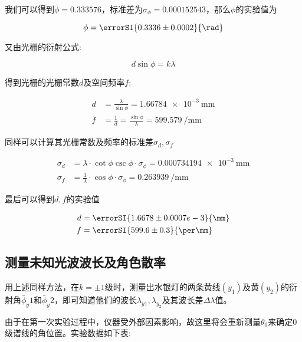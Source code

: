\documentclass[a4paper]{article}
\begin{document}
我们可以得到$\bar\phi=0.333576$，标准差为$\sigma_{\phi}=0.000152543$，那么$\phi$的实验值为

$$\phi=\errorSI{0.3336 \pm 0.0002}{\rad}$$

又由光栅的衍射公式:

$$d\sin{\phi}=k\lambda$$

得到光栅的光栅常数$d$及空间频率$f$:

$$\begin{aligned}
		d & =\frac{\lambda}{\sin{\phi}}=\SI{1.66784e-3}{\mm}              \\
		f & =\frac{1}{d}=\frac{\sin{\phi}}{\lambda}=\SI{599.579}{\per\mm}
	\end{aligned}$$

同样可以计算其光栅常数及频率的标准差$\sigma_d,\sigma_f$

$$\begin{aligned}
		\sigma_d & =\lambda\cdot\cot{\phi}\csc{\phi}\cdot\sigma_\phi=\SI{0.000734194e-3}{\mm} \\
		\sigma_f & =\frac{1}{\lambda}\cdot\cos{\phi}\cdot\sigma_\phi=\SI{0.263939}{\per\mm}
	\end{aligned}$$

最后可以得到$d,f$的实验值

$$\begin{aligned}
		d & =\errorSI{1.6678\pm 0.0007e-3}{\mm} \\
		f & =\errorSI{599.6\pm 0.3}{\per\mm}
	\end{aligned}$$

\subsection{测量未知光波波长及角色散率}
用上述同样方法，在$k=\pm1$级时，测量出水银灯的两条黄线$(y_1)$及黄$(y_2)$的衍射角$\bar\phi_y1$和$\bar\phi_y2$，即可知道他们的波长$\lambda_{y1},\lambda_{y_2}$及其波长差$\Delta\lambda$值。\par

由于在第一次实验过程中，仪器受外部因素影响，故这里将会重新测量$\theta_0$来确定0级谱线的角位置。实验数据如下表:

\begin{table}[htbp]
	\centering
	\captionsetup{justification=centering,margin=2cm}
	\caption{\label{tab:tab_data3}0级衍射角实验数据表}
\end{table}\par
\end{document}
